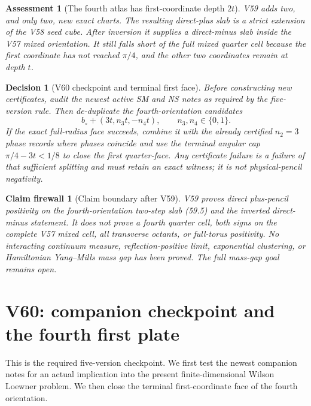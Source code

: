\documentclass[11pt,oneside]{article}
\newtheorem{assessment}[theorem]{Assessment}
\newtheorem{firewall}[theorem]{Claim firewall}
\newtheorem{decision}[theorem]{Decision}
\theoremstyle{definition}
\theoremstyle{remark}
\begin{document}
\begin{assessment}[The fourth atlas has first-coordinate depth \(2t\)]
\label{ass:newv59}
V59 adds two, and only two, new exact charts.  The resulting
direct-plus slab is a strict extension of the V58 seed cube.
After inversion it supplies a direct-minus slab inside the V57
mixed orientation.  It still falls short of the full mixed quarter
cell because the first coordinate has not reached \(\pi/4\), and
the other two coordinates remain at depth \(t\).
\end{assessment}

\begin{decision}[V60 checkpoint and terminal first face]
\label{dec:newv59-next}
Before constructing new certificates, audit the newest active SM
and NS notes as required by the five-version rule.  Then
de-duplicate the fourth-orientation candidates
\[
 b_\circ+(3t,n_3t,-n_4t),\qquad n_3,n_4\in\{0,1\}.   \tag{59.12}
\]
If the exact full-radius face succeeds, combine it with the
already certified \(n_2=3\) phase records where phases coincide
and use the terminal angular cap
\(\pi/4-3t<1/8\) to close the first quarter-face.  Any certificate
failure is a failure of that sufficient splitting and must retain
an exact witness; it is not physical-pencil negativity.
\end{decision}

\begin{firewall}[Claim boundary after V59]
\label{fire:newv59-final}
V59 proves direct plus-pencil positivity on the fourth-orientation
two-step slab (59.5) and the inverted direct-minus statement.  It
does not prove a fourth quarter cell, both signs on the complete
V57 mixed cell, all transverse octants, or full-torus positivity.
No interacting continuum measure, reflection-positive limit,
exponential clustering, or Hamiltonian Yang--Mills mass gap has
been proved.  The full mass-gap goal remains open.
\end{firewall}

\section{V60: companion checkpoint and the fourth first plate}
\label{sec:newv60-fourth-first-plate}

This is the required five-version checkpoint.  We first test the
newest companion notes for an actual implication into the present
finite-dimensional Wilson Loewner problem.  We then close the
terminal first-coordinate face of the fourth orientation.
\end{document}
